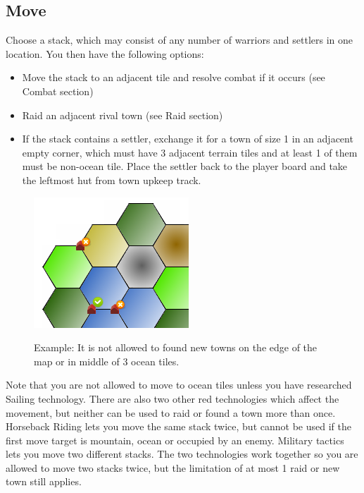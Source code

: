 \documentclass[11pt,a4paper,titlepage]{article}
\begin{document}
{  \subsection{Move}{
    Choose a stack, which may consist of any number of warriors and settlers
    in one location. You then have the following options:
    \begin{itemize}
    \item Move the stack to an adjacent tile and resolve combat if it occurs
      (see Combat section)
    \item Raid an adjacent rival town (see Raid section)
    \item If the stack contains a settler, exchange it for a town of size 1
      in an adjacent empty corner, which must have 3 adjacent terrain tiles
      and at least 1 of them must be non-ocean tile. Place the settler back
      to the player board and take the leftmost hut from town upkeep track.
    \end{itemize}

    \begin{figure}[!htb]
      \begin{minipage}[c]{0.2\textwidth}
        \label{fig:tech_irrigation}
        \includegraphics[scale=.6]{doe_example_new_town.png}
      \end{minipage}\hfill
      \begin{minipage}[c]{0.4\textwidth}
        \captionsetup{labelformat=empty, justification=justified, singlelinecheck=false}
        \caption{Example: It is not allowed to found new towns on the edge
          of the map or in middle of 3 ocean tiles.}
      \end{minipage}\hfill
      \label{fig:example_new_town}
    \end{figure}
    
    \noindent
    Note that you are not allowed to move to ocean tiles unless you have
    researched Sailing technology. There are also two other red technologies
    which affect the movement, but neither can be used to raid or found a town
    more than once. Horseback Riding lets you move the same stack twice, but
    cannot be used if the first move target is mountain, ocean or occupied
    by an enemy. Military tactics lets you move two different stacks. The two
    technologies work together so you are allowed to move two stacks twice, but
    the limitation of at most 1 raid or new town still applies.
    
}}
\end{document}
